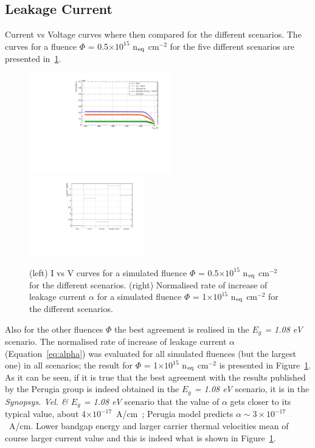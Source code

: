 \subsection{Leakage Current}

Current vs Voltage curves where then compared for the different scenarios. The curves for a fluence 
$\Phi$ =  0.5$\times10^{15}$ n$_{\rm eq}$ cm$^{-2}$ for the five different scenarios are presented
 in~\ref{fig:read_and_draw_alpha_Perugia2015_fl1e15}.
\begin{figure}[!htpb]
\centering
\includegraphics[width=0.55\textwidth]{IV_no_mult_Perugia_fl5e14.pdf}
\includegraphics[width=0.44\textwidth]{read_and_draw_alpha_Perugia2015_fl1e15.pdf}
\caption{\label{fig:read_and_draw_alpha_Perugia2015_fl1e15} (left) I vs V curves for a simulated fluence $\Phi$ =  0.5$\times10^{15}$ n$_{\rm eq}$ cm$^{-2}$ for the  different scenarios. (right) Normalised rate of increase of leakage current $\alpha$  for a simulated fluence $\Phi$ =  1$\times10^{15}$ n$_{\rm eq}$ cm$^{-2}$  for the  different scenarios.}
\end{figure}

Also for the other fluences $\Phi$ the best agreement is realised in the {\it $E_g$ = 1.08 eV} 
scenario. 
The normalised rate of increase of leakage current $\alpha$ (Equation~\ref{eq:alpha})  was evaluated 
for all simulated fluences (but the largest one) in all scenarios; the result for 
$\Phi$ =  1$\times10^{15}$ n$_{\rm eq}$ cm$^{-2}$  is presented in 
Figure~\ref{fig:read_and_draw_alpha_Perugia2015_fl1e15}. As it can be seen, if it is true that the best 
agreement with the results published by the Perugia group is indeed obtained in the {\it $E_g$ = 1.08 eV} 
scenario, it is in the {\it Synopsys. Vel. \& $E_g$ = 1.08 eV} scenario that the value of $\alpha$ 
gets closer to its typical value, about 4$\times10^{-17}$~A/cm~\cite{moll-thesis}; Perugia model 
predicts $\alpha\sim3\times10^{-17}$~A/cm.
Lower bandgap energy and larger carrier thermal velocities mean of course larger current value and this 
is indeed  what  is shown in Figure~\ref{fig:read_and_draw_alpha_Perugia2015_fl1e15}.

